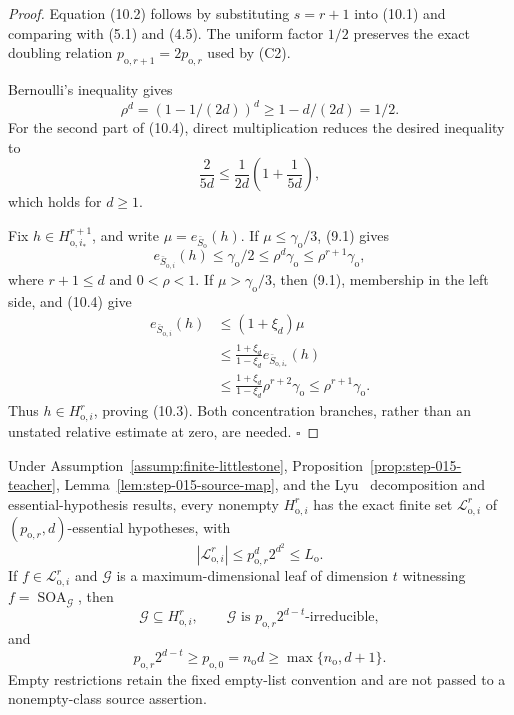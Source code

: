 \begin{proof}
Equation (10.2) follows by substituting \(s=r+1\) into (10.1) and comparing
with (5.1) and (4.5). The uniform factor \(1/2\) preserves the exact
doubling relation
\(p_{\mathrm o,r+1}=2p_{\mathrm o,r}\) used by (C2).

Bernoulli's inequality gives
\[
\rho^d=(1-1/(2d))^d\ge1-d/(2d)=1/2.
\]
For the second part of (10.4), direct multiplication reduces the desired
inequality to
\[
\frac{2}{5d}\le\frac1{2d}\left(1+\frac1{5d}\right),
\]
which holds for \(d\ge1\).

Fix \(h\in H_{\mathrm o,i_*}^{r+1}\), and write
\(\mu=e_{\bar S_{\mathrm o}}(h)\). If
\(\mu\le\gamma_{\mathrm o}/3\), (9.1) gives
\[
e_{\bar S_{\mathrm o,i}}(h)\le\gamma_{\mathrm o}/2
\le\rho^d\gamma_{\mathrm o}
\le\rho^{r+1}\gamma_{\mathrm o},
\]
where \(r+1\le d\) and \(0<\rho<1\). If
\(\mu>\gamma_{\mathrm o}/3\), then (9.1), membership in the left side,
and (10.4) give
\[
\begin{aligned}
e_{\bar S_{\mathrm o,i}}(h)
&\le(1+\xi_d)\mu\\
&\le\frac{1+\xi_d}{1-\xi_d}
e_{\bar S_{\mathrm o,i_*}}(h)\\
&\le\frac{1+\xi_d}{1-\xi_d}
\rho^{r+2}\gamma_{\mathrm o}
\le\rho^{r+1}\gamma_{\mathrm o}.
\end{aligned}
\]
Thus \(h\in H_{\mathrm o,i}^r\), proving (10.3). Both concentration
branches, rather than an unstated relative estimate at zero, are needed.
\(\square\)


\end{proof}

\begin{lemma}\label{lem:step-015-lists}
Under Assumption~\ref{assump:finite-littlestone},
Proposition~\ref{prop:step-015-teacher},
Lemma~\ref{lem:step-015-source-map}, and the Lyu~\citep{lyu2025} decomposition and
essential-hypothesis results, every nonempty \(H_{\mathrm o,i}^r\) has the
exact finite set \(\mathcal L_{\mathrm o,i}^r\) of
\((p_{\mathrm o,r},d)\)-essential hypotheses, with
\[
|\mathcal L_{\mathrm o,i}^r|
\le p_{\mathrm o,r}^d2^{d^2}\le L_{\mathrm o}.
\tag{11.1}
\]
If \(f\in\mathcal L_{\mathrm o,i}^r\) and
\(\mathcal G\) is a maximum-dimensional leaf of dimension \(t\) witnessing
\(f=\operatorname{SOA}_{\mathcal G}\), then
\[
\mathcal G\subseteq H_{\mathrm o,i}^r,\qquad
\mathcal G\text{ is }
p_{\mathrm o,r}2^{d-t}\text{-irreducible},
\tag{11.2}
\]
and
\[
p_{\mathrm o,r}2^{d-t}\ge p_{\mathrm o,0}
=n_{\mathrm o}d\ge\max\{n_{\mathrm o},d+1\}.
\tag{11.3}
\]
Empty restrictions retain the fixed empty-list convention and are not
passed to a nonempty-class source assertion.


\end{lemma}

